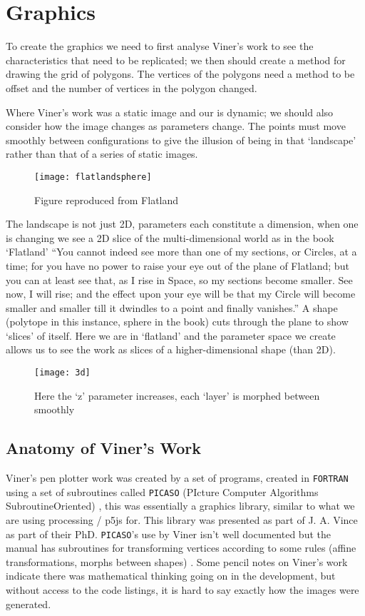 \chapter{Graphics}
To create the graphics we need to first analyse Viner's work to see the
characteristics that need to be replicated; we then should create a method for
drawing the grid of polygons. The vertices of the polygons need a method to be
offset and the number of vertices in the polygon changed.

Where Viner's work was a static image and our is dynamic; we should also
consider how the image changes as parameters change. The points must move
smoothly between configurations to give the illusion of being in that
`landscape' rather than that of a series of static images.

\begin{figure}[H]
    \centering
    \texttt{[image: flatlandsphere]}
    \caption{Figure reproduced from Flatland \citep[p.112]{abbott1885flatland}}
\end{figure}

The landscape is not just 2D, parameters each constitute a dimension, when one
is changing we see a 2D slice of the multi-dimensional world as in the book
`Flatland' ``You cannot indeed see more than one of my sections, or Circles, at
a time; for you have no power to raise your eye out of the plane of Flatland;
but you can at least see that, as I rise in Space, so my sections become
smaller. See now, I will rise; and the effect upon your eye will be that my
Circle will become smaller and smaller till it dwindles to a point and finally
vanishes.'' \citep[p.112]{abbott1885flatland} A shape (polytope in this instance,
sphere in the book) cuts through the plane to show `slices' of itself. Here we
are in `flatland' and the parameter space we create allows us to see the work as
slices of a higher-dimensional shape (than 2D). 

\begin{figure}[H]
    \centering
    \texttt{[image: 3d]}
    \caption{Here the `z' parameter increases, each `layer' is morphed between
    smoothly}
\end{figure}

\section{Anatomy of Viner's Work}
Viner's pen plotter work was created by a set of programs, created in
\verb|FORTRAN| using a set of subroutines called \verb|PICASO| (PIcture Computer
Algorithms SubroutineOriented) \citep{lycett_2016}, this was essentially a
graphics library, similar to what we are using processing / p5js for. This
library was presented as part of J. A. Vince as part of their PhD.
\verb|PICASO|'s use by Viner isn't well documented but the manual has
subroutines for transforming vertices according to some rules (affine
transformations, morphs between shapes) \citep{picaso_manual}. Some pencil notes
on Viner's work indicate there was mathematical thinking going on in
the development, but without access to the code listings, it is hard to say
exactly how the images were generated.

